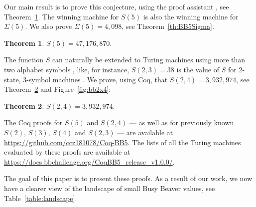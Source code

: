 \documentclass[a4paper,british]{article}
\theoremstyle{definition} %
\newtheorem{theorem}{Theorem}[section]
\numberwithin{equation}{section}
\theoremstyle{definition} %
\newcommand{\BBtheFifth}{47{,}176{,}870}
\newcommand{\SigmaTheFifth}{4{,}098}
\newcommand{\BBTxF}{3{,}932{,}974}
\begin{document}
Our main result is to prove this conjecture, using the \Coq proof assistant \cite{the_coq_development_team_2024_14542673}, see Theorem~\ref{th:BB5}. The winning machine for $S(5)$ is also the winning machine for $\Sigma(5)$. We also prove $\Sigma(5) = \SigmaTheFifth$, see Theorem~\ref{th:BB5Sigma}.

\begin{theorem}\label{th:BB5}
    $S(5) = \BBtheFifth$.
\end{theorem}

The function $S$ can naturally be extended to Turing machines using more than two alphabet symbols \cite{BradyMeaningOfLife}, like, for instance, $S(2,3) = 38$ is the value of $S$ for 2-state, 3-symbol machines \cite{BradyMeaningOfLife, MICHEL200445, LafittePapazian2007}. We prove, using Coq, that $S(2,4) = \BBTxF$, see Theorem~\ref{th:BB2x4} and Figure~\ref{fig:bb2x4}:

\begin{theorem}\label{th:BB2x4}
    $S(2,4) = \BBTxF$.
\end{theorem}

The Coq proofs for $S(5)$ and $S(2,4)$ --- as well as for previously known $S(2),\,S(3),\,S(4)$ and $S(2,3)$ --- are available at \url{https://github.com/ccz181078/Coq-BB5}. The lists of all the Turing machines evaluated by these proofs are available at \url{https://docs.bbchallenge.org/CoqBB5_release_v1.0.0/}.

The goal of this paper is to present these proofs. As a result of our work, we now have a clearer view of the landscape of small Busy Beaver values, see Table~\ref{table:landscape}.
\end{document}
